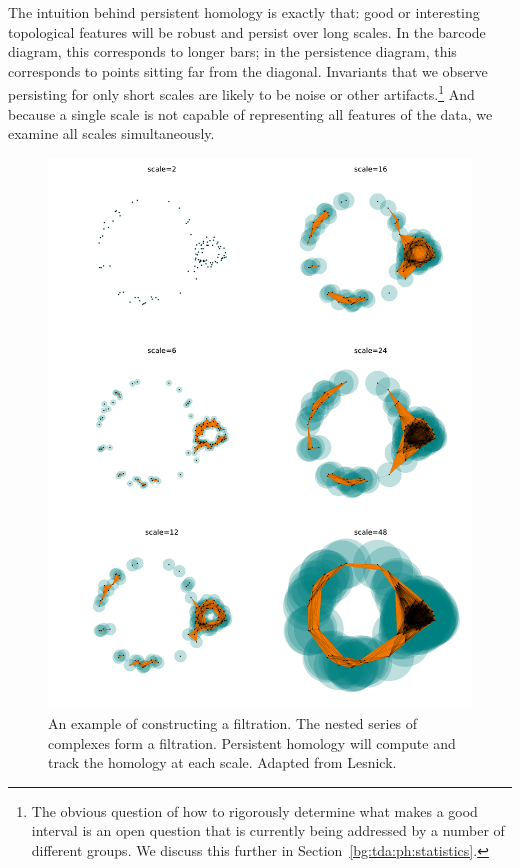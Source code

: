 The intuition behind persistent homology is exactly that: good or interesting topological features will be robust and persist over long scales.
In the barcode diagram, this corresponds to longer bars; in the persistence diagram, this corresponds to points sitting far from the diagonal.
Invariants that we observe persisting for only short scales are likely to be noise or other artifacts.\footnote{The obvious question of how to rigorously determine what makes a good interval is an open question that is currently being addressed by a number of different groups. We discuss this further in Section~\ref{bg:tda:ph:statistics}.}
And because a single scale is not capable of representing all features of the data, we examine all scales simultaneously.

\begin{figure}
\centering
\includegraphics[width=.8\textwidth]{./fig/background/expanding_balls.pdf}
\caption[Multiscale Topological Structure]{An example of constructing a filtration. The nested series of complexes form a filtration. Persistent homology will compute and track the homology at each scale. Adapted from Lesnick.}
\label{fig:bg:expanding_balls}
\end{figure}


